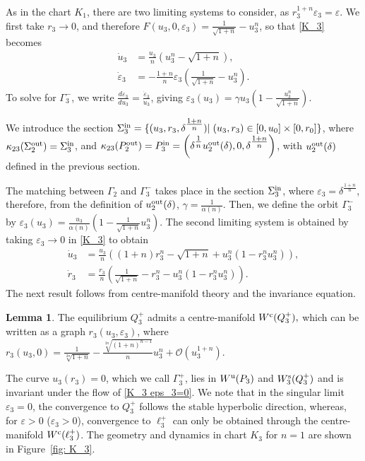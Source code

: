 \documentclass{article}
\theoremstyle{definition}
\numberwithin{equation}{section}
\newtheorem{lem}[prop]{Lemma}
\begin{document}
As in the chart $K_1$, there are two limiting systems to consider, as $r_3^{1+n}\varepsilon_3=\varepsilon$.
We first take $r_3\to0$, and therefore $F(u_3,0, \varepsilon_3)=\tfrac{1}{\sqrt{1+n}}-u_3^n$, so that \eqref{K_3} becomes
\begin{equation}
    \begin{aligned}
        \dot{u}_3&=\tfrac{u_3}{n}\left(u_3^n-\sqrt{1+n}\right),\\
        \dot{\varepsilon}_3&=-\tfrac{1+n}{n}\varepsilon_3\left(\tfrac{1}{\sqrt{1+n}}-u_3^n\right).
        \label{K_3 r_3=0}
    \end{aligned}
\end{equation}
To solve for $\Gamma_3^-$, we write $\tfrac{d\varepsilon_3}{du_3}=\tfrac{\dot{\varepsilon}_3}{\dot{u}_3}$, giving $\varepsilon_3(u_3)=\gamma u_3\left(1-\tfrac{u_3^n}{\sqrt{1+n}}\right)$.

We introduce the section $\Sigma_3^{\rm in}=\{(u_3, r_3, \delta^{\tfrac{1+n}{n}})|\;(u_3, r_3)\in[0, u_0]\times[0,r_0]\}$, where $\kappa_{23}(\Sigma_2^{\rm out})=\Sigma_3^{\rm in}$, and $\kappa_{23}(P_2^{\rm out})=P_3^{\rm in}=\left(\delta^{\tfrac{1}{n}}u_2^{\rm out}(\delta),
0,
\delta^{\tfrac{1+n}{n}}\right)$, with $u_2^{\rm out}(\delta)$ defined in the previous section.

The matching between $\Gamma_2$ and $\Gamma_3^-$ takes place in the section $\Sigma_3^{\rm in}$, where $\varepsilon_3=\delta^{\tfrac{1+n}{n}}$, therefore, from the definition of $u_2^{\rm out}(\delta)$, $\gamma=\tfrac{1}{\alpha(n)}$. Then, we define the orbit $\Gamma_3^{-}$ by  $\varepsilon_3(u_3)=\tfrac{u_3}{\alpha(n)}\left(1-\tfrac{1}{\sqrt{1+n}}u_3^n\right)$. 
The second limiting system is obtained by taking $\varepsilon_3\to0$ in \eqref{K_3} to obtain 
\begin{equation}
    \begin{aligned}
        \dot{u}_3&=\tfrac{u_3}{n}\left( (1+n)r_3^n-\sqrt{1+n}+u_3^n(1-r_3^nu_3^n)\right),\\ \dot{r}_3&=\tfrac{r_3}{n}\left(\tfrac{1}{\sqrt{1+n}}-r_3^n-u_3^n(1-r_3^nu_3^n)\right).
        \label{K_3 eps_3=0}
    \end{aligned}
\end{equation}
The next result follows from centre-manifold theory and the invariance equation.
\begin{lem}
    The equilibrium $Q_3^+$ admits a centre-manifold $W^{\rm c}(Q_3^+),$ which can be written as a graph $r_3(u_3, \varepsilon_3)$, where $r_3(u_3, 0)=\tfrac{1}{\sqrt[2n]{1+n}}-\tfrac{\sqrt[2n]{(1+n)^{n-1}}}{n}u_3^n+\mathcal{O}(u_3^{1+n})$.
\end{lem}
The curve $u_3(r_3)=0$, which we call $\Gamma_3^{+}$, lies in $W^{\rm u}(P_3)$ and $W_{3}^{\rm s}(Q_3^+)$ and is invariant under the flow of \eqref{K_3 eps_3=0}. We note that in the singular limit $\varepsilon_3=0$, the convergence to $Q_3^+$ follows the stable hyperbolic direction, whereas, for $\varepsilon>0$ ($\varepsilon_3>0$), convergence to $\ell_3^+$ can only be obtained through the centre-manifold $W^{\rm c}(\ell_3^+)$. 
The geometry and dynamics in chart $K_3$ for $n=1$ are shown in Figure~\ref{fig: K_3}.
\end{document}
